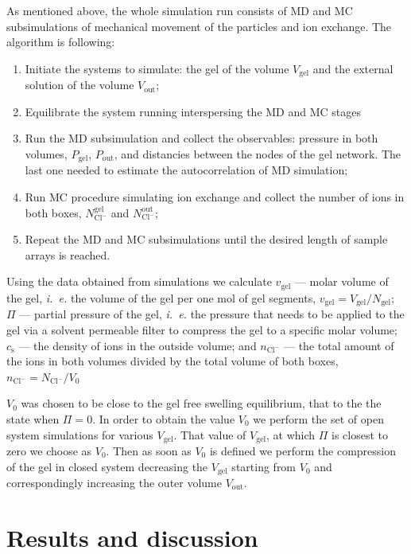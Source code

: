 \documentclass[journal,article,submit,pdftex,moreauthors]{Definitions/mdpi}
\newcommand{\ie}{\textit{i.~e.} }
\newcommand{\ncl}{n_\mathrm{Cl^-}}
\newcommand{\Ncl}{N_\mathrm{Cl^-}}
\newcommand{\gel}{^\mathrm{gel}}
\newcommand{\out}{^{\mathrm{out}}}
\newcommand{\cs}{c_{\mathrm{s}}}
\newcommand{\Vgel}{V_\mathrm{gel}}
\newcommand{\vgel}{v_\mathrm{gel}}
\newcommand{\Ngel}{N_\mathrm{gel}}
\newcommand{\Pgel}{\Pi}
\newcommand{\Vout}{V_\mathrm{out}}
\newcommand{\Vbox}{V_0}
\begin{document}
As mentioned above, the whole simulation run consists of MD and MC subsimulations of mechanical movement of the particles and ion exchange. The algorithm is following:
\begin{enumerate}
\item Initiate the systems to simulate: the gel of the volume $\Vgel$ and the external solution of the volume $\Vout$;
\item Equilibrate the system running interspersing the MD and MC stages
\item Run the MD subsimulation and collect the observables: pressure in both volumes, $P_\mathrm{gel}$, $P_\mathrm{out}$, and distancies between the nodes of the gel network. The last one needed to estimate the autocorrelation of MD simulation;
\item Run MC procedure simulating ion exchange and collect the number of ions in both boxes, 
$\Ncl\gel$ and $\Ncl\out$; 
\item Repeat the MD and MC subsimulations until the desired length of sample arrays is reached.
\end{enumerate}


Using the data obtained from simulations we calculate  
$\vgel$ --- molar volume of the gel, \ie the volume of the gel per one mol of gel segments, $\vgel = \Vgel / \Ngel$;
$\Pgel$ --- partial pressure of the gel, \ie the pressure that needs to be applied to the gel via a solvent permeable filter to compress the gel to a specific molar volume;
$\cs$ --- the density of ions in  the outside volume;
and $\ncl$ --- the total amount of the ions in both volumes divided by the total volume of both boxes, $\ncl = \Ncl/\Vbox$

$\Vbox$ was chosen to be close to the gel free swelling equilibrium, that to the the state when $\Pgel = 0$. 
In order to obtain the value $\Vbox$ we perform the set of open system simulations for various $\Vgel$. That value of $\Vgel$, at which $\Pgel$ is closest to zero we choose as $\Vbox$.
Then as soon as $\Vbox$ is defined we perform the compression of the gel in closed system decreasing the $\Vgel$ starting from $\Vbox$ and correspondingly increasing the outer volume $\Vout$.







\section{Results and discussion}
\end{document}
